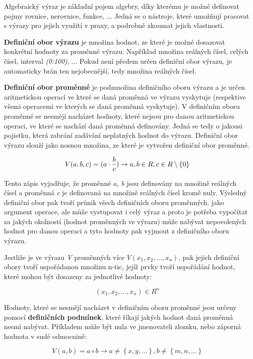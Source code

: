 Algebraický výraz je základní pojem algebry, díky kterému je možné definovat pojmy rovnice, nerovnice, funkce, ... Jedná se o nástroje, které umožňují pracovat s výrazy pro jejich využití v praxy, a podrobně zkoumat jejich vlastnosti.


{\bf Definiční obor výrazu} je množina hodnot, ze které je možné dosazovat konkrétní hodnoty za proměnné výrazu. Například množina reálných čísel, celých čísel, interval {\it (0:100)}, ... Pokud není předem určen definiční obor výrazu, je automaticky brán ten nejobecnější, tedy množina reálných čísel.

{\bf Definiční obor proměnné} je podmnožina definičního oboru výrazu a je určen aritmetickou operací ve které se daná proměnná ve výrazu vyskytuje (respektive všemi operacemi ve kterých se daná proměnná vyskytuje). V definičním oboru proměnné se nesmějí nacházet hodnoty, které nejsou pro danou aritmetickou operaci, ve které se nachází daná proměnná definovány. Jedná se tedy o jakousi pojistku, která zabrání zadávání neplatných hodnot do výrazu. Definiční obor výrazu slouží jako nosnou množina, ze které je vytvořen definiční obor proměnné.

$$ V(a,b,c) =( a \cdot {b \over c}) \rightarrow a, b \in R, c \in R \setminus \left\{0\right\}  $$

Tento zápis vyjadřuje, že proměnné {\it a, b} jsou definovány na množině reálných čísel a proměnná {\it c} je definovaná na množině reálných čísel kromě nuly. Výsledný definiční obor pak tvoří průnik všech definičních oboru proměnných. jako argument operace, ale může vystupovat i celý výraz a proto je potřeba vypočítat za jakých okolností (hodnot proměnných ve výrazu) může nabývat nepovolených hodnot pro danou operaci a tyto hodnoty pak vyjmout z definičního oboru výrazu.

Jestliže je ve výrazu {\it V} proměnných více $ V(x_1, x_2 , ... , x_n)$, pak jejich definiční obory tvoří uspořádanou množinu n-tic, jejíž prvky tvoří uspořádání hodnot, které mohou být dosazeny za jednotlivé hodnoty:

$$ (x_1, x_2, ... , x_n) \in R^n $$

Hodnoty, které se nesmějí nacházet v definičním oboru proměnné jsou určeny pomocí {\bf definičních podmínek}, které říkají jakých hodnot daná proměnná nesmí nabývat. Příkladem může být nula ve jmenovateli zlomku, nebo záporná hodnota v sudé odmocnině:

$$ V(a, b) = a \circ b \rightarrow a \not = \left\{x, y, ... \right\}, b \not = \left\{ m, n, ...\right\} $$

